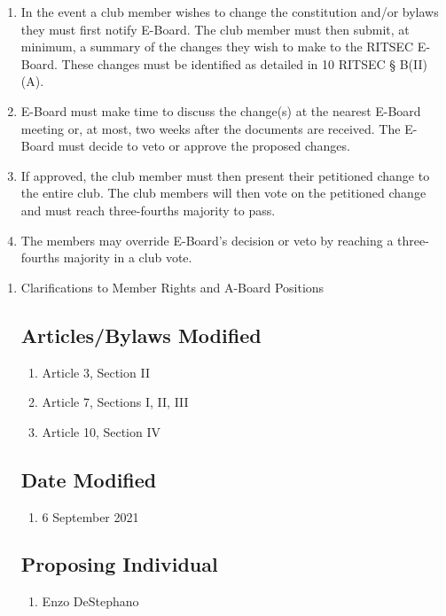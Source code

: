\begin{enumerate}
  \item In the event a club member wishes to change the constitution and/or
    bylaws they must first notify E-Board. The club member must then submit, at
    minimum, a summary of the changes they wish to make to the RITSEC E-Board.
    These changes must be identified as detailed in 10 RITSEC § B(II)(A).
  \item E-Board must make time to discuss the change(s) at the nearest E-Board
    meeting or, at most, two weeks after the documents are received. The
    E-Board must decide to veto or approve the proposed changes.
  \item If approved, the club member must then present their petitioned change
    to the entire club. The club members will then vote on the petitioned
    change and must reach three-fourths majority to pass.
  \item The members may override E-Board's decision or veto by reaching a
    three-fourths majority in a club vote.
\end{enumerate}

  \begin{enumerate}
    \item Clarifications to Member Rights and A-Board Positions

      \subsection{Articles/Bylaws Modified}
      \begin{enumerate}
        \item Article 3, Section II
        \item Article 7, Sections I, II, III
        \item Article 10, Section IV
      \end{enumerate} 

      \subsection{Date Modified}
      \begin{enumerate}
        \item 6 September 2021
      \end{enumerate}

      \subsection{Proposing Individual}
      \begin{enumerate}
        \item Enzo DeStephano
      \end{enumerate}
    
    \end{enumerate}
    